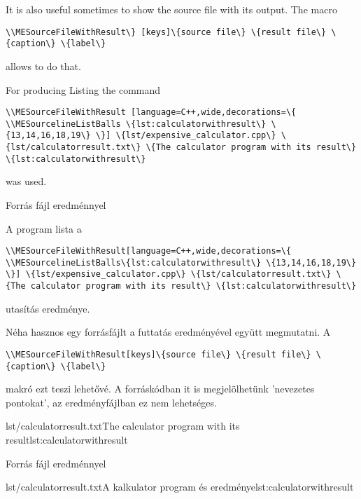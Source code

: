 {
It is also useful sometimes to show the source file with its output.
The macro 
\par\noindent\lstinline|\\MESourceFileWithResult\} [keys]\{source file\} \{result file\} \{caption\} \{label\}|
\par\noindent allows to do that. 

 For producing Listing \ao{\ref{lst:calculatorwithresult}}
the command 
\par\noindent\lstinline|\\MESourceFileWithResult [language=C++,wide,decorations=\{
	\\MESourcelineListBalls \{lst:calculatorwithresult\} \{13,14,16,18,19\}
\}] \{lst/expensive_calculator.cpp\}
\{lst/calculatorresult.txt\} \{The calculator program with its result\} \{lst:calculatorwithresult\}|
\par\noindent was used.
}
{Forrás fájl eredménnyel}
{
A \ao{\ref{lst:calculatorwithresult}} program lista
a 
\par\noindent\lstinline|\\MESourceFileWithResult[language=C++,wide,decorations=\{
	\\MESourcelineListBalls\{lst:calculatorwithresult\} \{13,14,16,18,19\}
\}] \{lst/expensive_calculator.cpp\}
\{lst/calculatorresult.txt\} \{The calculator program with its result\} \{lst:calculatorwithresult\}|
\par\noindent utasítás eredménye.

Néha hasznos egy forrásfájlt a futtatás eredményével együtt megmutatni.
A
\par\noindent\lstinline|\\MESourceFileWithResult[keys]\{source file\} \{result file\} \{caption\} \{label\}|
\par\noindent makró ezt teszi lehetővé.
A forráskódban it is megjelölhetünk 'nevezetes pontokat', az eredményfájlban ez nem lehetséges.
}

{

{lst/calculatorresult.txt}{The calculator program with its result}{lst:calculatorwithresult}

}
{Forrás fájl eredménnyel}
{

{lst/calculatorresult.txt}{A kalkulator program és eredménye}{lst:calculatorwithresult}
}

